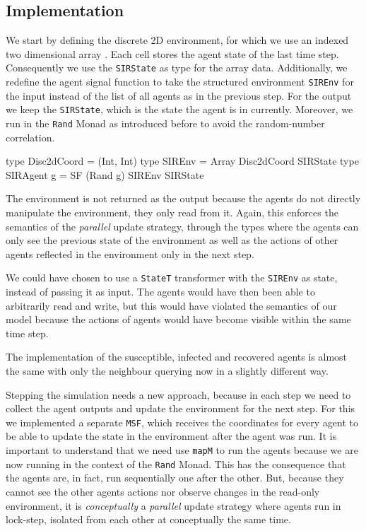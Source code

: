 \subsection{Implementation}
\label{sub:timedriven_thirdstep_impl}
We start by defining the discrete 2D environment, for which we use an indexed two dimensional array \cite{array_hackage}. Each cell stores the agent state of the last time step. Consequently we use the \texttt{SIRState} as type for the array data. Additionally, we redefine the agent signal function to take the structured environment \texttt{SIREnv} for the input instead of the list of all agents as in the previous step. For the output we keep the \texttt{SIRState}, which is the state the agent is in currently. Moreover, we run in the \texttt{Rand} Monad as introduced before to avoid the random-number correlation. 

\begin{HaskellCode}
type Disc2dCoord = (Int, Int)
type SIREnv      = Array Disc2dCoord SIRState
type SIRAgent g  = SF (Rand g) SIREnv SIRState
\end{HaskellCode}

The environment is not returned as the output because the agents do not directly manipulate the environment, they only read from it. Again, this enforces the semantics of the \textit{parallel} update strategy, through the types where the agents can only see the previous state of the environment as well as the actions of other agents reflected in the environment only in the next step.

We could have chosen to use a \texttt{StateT} transformer with the \texttt{SIREnv} as state, instead of passing it as input. The agents would have then been able to arbitrarily read and write, but this would have violated the semantics of our model because the actions of agents would have become visible within the same time step.

The implementation of the susceptible, infected and recovered agents is almost the same with only the neighbour querying now in a slightly different way. 

Stepping the simulation needs a new approach, because in each step we need to collect the agent outputs and update the environment for the next step. For this we implemented a separate \texttt{MSF}, which receives the coordinates for every agent to be able to update the state in the environment after the agent was run. It is important to understand that we need use \texttt{mapM} to run the agents because we are now running in the context of the \texttt{Rand} Monad. This has the consequence that the agents are, in fact, run sequentially one after the other. But, because they cannot see the other agents actions nor observe changes in the read-only environment, it is \textit{conceptually} a \textit{parallel} update strategy where agents run in lock-step, isolated from each other at conceptually the same time.
  
